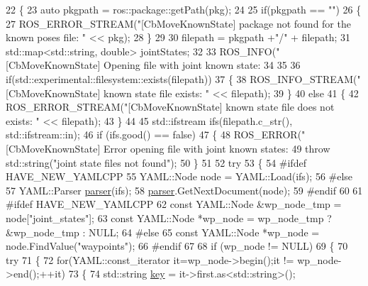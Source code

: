 \begin{DoxyCode}
22 \{
23   \textcolor{keyword}{auto} pkgpath = ros::package::getPath(pkg);
24 
25   \textcolor{keywordflow}{if}(pkgpath == \textcolor{stringliteral}{""})
26   \{
27     ROS\_ERROR\_STREAM(\textcolor{stringliteral}{"[CbMoveKnownState] package not found for the known poses file: "} << pkg);
28   \}
29 
30   filepath =  pkgpath +\textcolor{stringliteral}{"/"} + filepath;
31   std::map<std::string, double> jointStates;
32 
33   ROS\_INFO(\textcolor{stringliteral}{"[CbMoveKnownState] Opening file with joint known state: %
34 
35 
36   \textcolor{keywordflow}{if}(std::experimental::filesystem::exists(filepath))
37   \{
38     ROS\_INFO\_STREAM(\textcolor{stringliteral}{"[CbMoveKnownState] known state file exists: "} << filepath);
39   \}
40   \textcolor{keywordflow}{else}
41   \{
42     ROS\_ERROR\_STREAM(\textcolor{stringliteral}{"[CbMoveKnownState] known state file does not exists: "} << filepath);
43   \}
44 
45   std::ifstream ifs(filepath.c\_str(), std::ifstream::in);
46   \textcolor{keywordflow}{if} (ifs.good() == \textcolor{keyword}{false})
47   \{
48     ROS\_ERROR(\textcolor{stringliteral}{"[CbMoveKnownState] Error opening file with joint known states: %
49     \textcolor{keywordflow}{throw} std::string(\textcolor{stringliteral}{"joint state files not found"});
50   \}
51 
52   \textcolor{keywordflow}{try}
53   \{
54 \textcolor{preprocessor}{#ifdef HAVE\_NEW\_YAMLCPP}
55     YAML::Node node = YAML::Load(ifs);
56 \textcolor{preprocessor}{#else}
57     YAML::Parser \hyperlink{namespacegenerate__debs_a4a9ae4bb85fc62d7973ea3d09ced6c26}{parser}(ifs);
58     \hyperlink{namespacegenerate__debs_a4a9ae4bb85fc62d7973ea3d09ced6c26}{parser}.GetNextDocument(node);
59 \textcolor{preprocessor}{#endif}
60 
61 \textcolor{preprocessor}{#ifdef HAVE\_NEW\_YAMLCPP}
62     \textcolor{keyword}{const} YAML::Node &wp\_node\_tmp = node[\textcolor{stringliteral}{"joint\_states"}];
63     \textcolor{keyword}{const} YAML::Node *wp\_node = wp\_node\_tmp ? &wp\_node\_tmp : NULL;
64 \textcolor{preprocessor}{#else}
65     \textcolor{keyword}{const} YAML::Node *wp\_node = node.FindValue(\textcolor{stringliteral}{"waypoints"});
66 \textcolor{preprocessor}{#endif}
67 
68     \textcolor{keywordflow}{if} (wp\_node != NULL)
69     \{
70       \textcolor{keywordflow}{try}
71       \{
72         \textcolor{keywordflow}{for}(YAML::const\_iterator it=wp\_node->begin();it != wp\_node->end();++it) 
73         \{
74           std::string \hyperlink{namespacekeyboard__server__node_af0ebd8a9e1564ddc13a227c727602466}{key} = it->first.as<std::string>(); 
}}
\end{DoxyCode}
